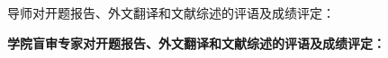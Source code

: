 
{
    \bfseries

    {
        \noindent 导师对开题报告、外文翻译和文献综述的评语及成绩评定：
    }
    \mbox{} \vfill
    \thesisproposaleval
    \signature{导师签名}

    \bfseries
    {
        \noindent 学院盲审专家对开题报告、外文翻译和文献综述的评语及成绩评定：
    }
    \mbox{} \vfill
    \thesisproposaleval
    \signature{开题报告审核负责人（签名/签章）}
}
